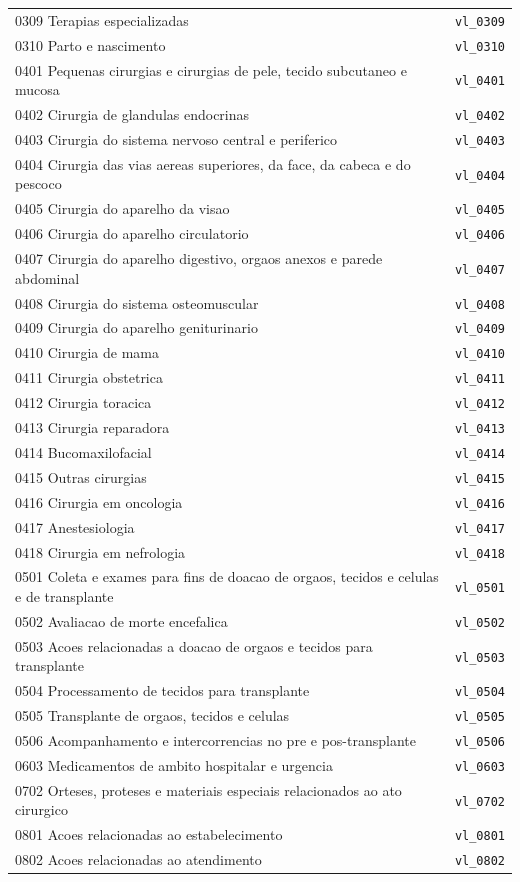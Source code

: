 \documentclass[12pt,a4paper]{report}
\begin{document}
\begin{longtable}{p{11.5cm} l}
0309 Terapias especializadas & \texttt{vl\_0309} \\
0310 Parto e nascimento & \texttt{vl\_0310} \\
0401 Pequenas cirurgias e cirurgias de pele, tecido subcutaneo e mucosa & \texttt{vl\_0401} \\
0402 Cirurgia de glandulas endocrinas & \texttt{vl\_0402} \\
0403 Cirurgia do sistema nervoso central e periferico & \texttt{vl\_0403} \\
0404 Cirurgia das vias aereas superiores, da face, da cabeca e do pescoco & \texttt{vl\_0404} \\
0405 Cirurgia do aparelho da visao & \texttt{vl\_0405} \\
0406 Cirurgia do aparelho circulatorio & \texttt{vl\_0406} \\
0407 Cirurgia do aparelho digestivo, orgaos anexos e parede abdominal & \texttt{vl\_0407} \\
0408 Cirurgia do sistema osteomuscular & \texttt{vl\_0408} \\
0409 Cirurgia do aparelho geniturinario & \texttt{vl\_0409} \\
0410 Cirurgia de mama & \texttt{vl\_0410} \\
0411 Cirurgia obstetrica & \texttt{vl\_0411} \\
0412 Cirurgia toracica & \texttt{vl\_0412} \\
0413 Cirurgia reparadora & \texttt{vl\_0413} \\
0414 Bucomaxilofacial & \texttt{vl\_0414} \\
0415 Outras cirurgias & \texttt{vl\_0415} \\
0416 Cirurgia em oncologia & \texttt{vl\_0416} \\
0417 Anestesiologia & \texttt{vl\_0417} \\
0418 Cirurgia em nefrologia & \texttt{vl\_0418} \\
0501 Coleta e exames para fins de doacao de orgaos, tecidos e celulas e de transplante & \texttt{vl\_0501} \\
0502 Avaliacao de morte encefalica & \texttt{vl\_0502} \\
0503 Acoes relacionadas a doacao de orgaos e tecidos para transplante & \texttt{vl\_0503} \\
0504 Processamento de tecidos para transplante & \texttt{vl\_0504} \\
0505 Transplante de orgaos, tecidos e celulas & \texttt{vl\_0505} \\
0506 Acompanhamento e intercorrencias no pre e pos-transplante & \texttt{vl\_0506} \\
0603 Medicamentos de ambito hospitalar e urgencia & \texttt{vl\_0603} \\
0702 Orteses, proteses e materiais especiais relacionados ao ato cirurgico & \texttt{vl\_0702} \\
0801 Acoes relacionadas ao estabelecimento & \texttt{vl\_0801} \\
0802 Acoes relacionadas ao atendimento & \texttt{vl\_0802} \\
\bottomrule
\end{longtable}
\end{document}
